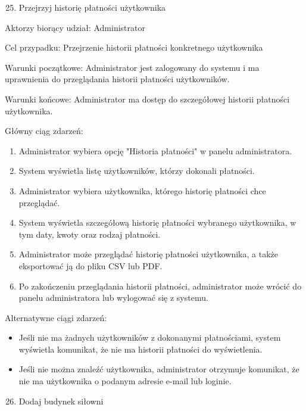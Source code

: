 \documentclass[
]{article}
\providecommand{\tightlist}{%
  \setlength{\itemsep}{0pt}\setlength{\parskip}{0pt}}
\begin{document}
\begin{enumerate}
\setcounter{enumi}{24}
\tightlist
\item
  {Przejrzyj historię płatności użytkownika}
\end{enumerate}

{Aktorzy biorący udział: Administrator}

{Cel przypadku: Przejrzenie historii płatności konkretnego użytkownika}

{Warunki początkowe: Administrator jest zalogowany do systemu i ma
uprawnienia do przeglądania historii płatności użytkowników.}

{Warunki końcowe: Administrator ma dostęp do szczegółowej historii
płatności użytkownika.}

{Główny ciąg zdarzeń:}

\begin{enumerate}
\tightlist
\item
  {Administrator wybiera opcję "Historia płatności" w panelu
  administratora.}
\item
  {System wyświetla listę użytkowników, którzy dokonali płatności.}
\item
  {Administrator wybiera użytkownika, którego historię płatności chce
  przeglądać.}
\item
  {System wyświetla szczegółową historię płatności wybranego
  użytkownika, w tym daty, kwoty oraz rodzaj płatności.}
\item
  {Administrator może przeglądać historię płatności użytkownika, a także
  eksportować ją do pliku CSV lub PDF.}
\item
  {Po zakończeniu przeglądania historii płatności, administrator może
  wrócić do panelu administratora lub wylogować się z systemu.}
\end{enumerate}

{Alternatywne ciągi zdarzeń:}

\begin{itemize}
\tightlist
\item
  {Jeśli nie ma żadnych użytkowników z dokonanymi płatnościami, system
  wyświetla komunikat, że nie ma historii płatności do wyświetlenia.}
\item
  {Jeśli nie można znaleźć użytkownika, administrator otrzymuje
  komunikat, że nie ma użytkownika o podanym adresie e-mail lub
  loginie.}
\end{itemize}

{}

{}

\begin{enumerate}
\setcounter{enumi}{25}
\tightlist
\item
  {Dodaj budynek siłowni}
\end{enumerate}
\end{document}
